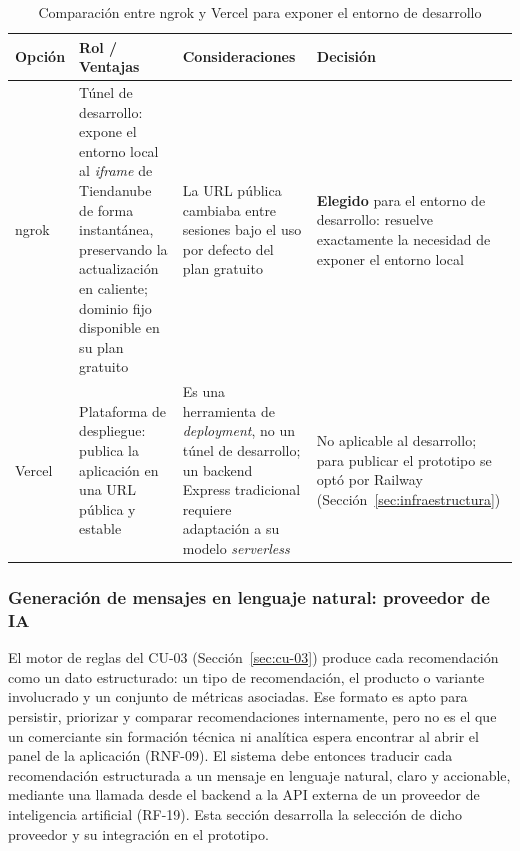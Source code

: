 \begin{table}[h]
\centering
\caption{Comparación entre ngrok y Vercel para exponer el entorno de desarrollo}
\label{tab:comparativo_tunel}
\renewcommand{\arraystretch}{1.3}
\begin{tabular}{|m{2.3cm}|m{4.4cm}|m{4.4cm}|m{3.4cm}|}
\hline
\textbf{Opción} & \textbf{Rol / Ventajas} & \textbf{Consideraciones} & \textbf{Decisión} \\
\hline
ngrok & Túnel de desarrollo: expone el entorno local al \emph{iframe} de Tiendanube de forma instantánea, preservando la actualización en caliente; dominio fijo disponible en su plan gratuito & La URL pública cambiaba entre sesiones bajo el uso por defecto del plan gratuito & \textbf{Elegido} para el entorno de desarrollo: resuelve exactamente la necesidad de exponer el entorno local \\
\hline
Vercel & Plataforma de despliegue: publica la aplicación en una URL pública y estable & Es una herramienta de \emph{deployment}, no un túnel de desarrollo; un backend Express tradicional requiere adaptación a su modelo \emph{serverless} & No aplicable al desarrollo; para publicar el prototipo se optó por Railway (Sección~\ref{sec:infraestructura}) \\
\hline
\end{tabular}
\end{table}

\subsubsection{Generación de mensajes en lenguaje natural: proveedor de IA}
\label{sec:generacion-mensajes-ia}

El motor de reglas del CU-03 (Sección~\ref{sec:cu-03}) produce cada recomendación como un dato estructurado: un tipo de recomendación, el producto o variante involucrado y un conjunto de métricas asociadas. Ese formato es apto para persistir, priorizar y comparar recomendaciones internamente, pero no es el que un comerciante sin formación técnica ni analítica espera encontrar al abrir el panel de la aplicación (RNF-09). El sistema debe entonces traducir cada recomendación estructurada a un mensaje en lenguaje natural, claro y accionable, mediante una llamada desde el backend a la API externa de un proveedor de inteligencia artificial (RF-19). Esta sección desarrolla la selección de dicho proveedor y su integración en el prototipo.

